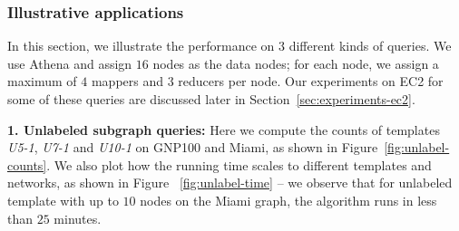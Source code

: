 \subsubsection{Illustrative applications}
In this section, we illustrate the performance on $3$ different kinds of
queries. We use Athena and assign $16$ nodes as the data nodes; for each node,
we assign a maximum of $4$ mappers and $3$ reducers per node. Our experiments
on EC2 for some of these queries are discussed later in
Section~\ref{sec:experiments-ec2}.

\smallskip
\textbf{1. Unlabeled subgraph queries:} Here we compute the counts of
templates \emph{U5-1}, \emph{U7-1} and \emph{U10-1} on GNP100 and Miami, as
shown in Figure~\ref{fig:unlabel-counts}. We also plot how the running time
scales to different templates and networks, as shown in Figure
~\ref{fig:unlabel-time} -- we observe that for unlabeled template with up to
$10$ nodes on the Miami graph, the algorithm runs in less than $25$ minutes.

